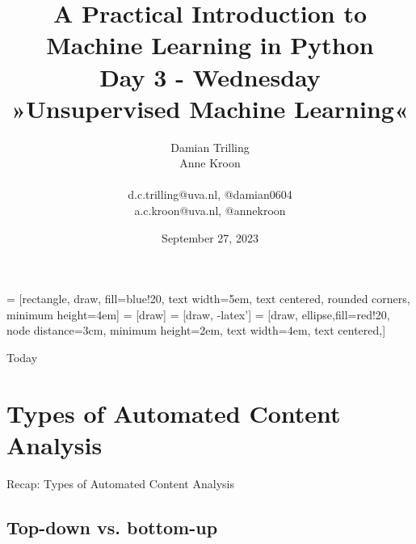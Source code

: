 \documentclass[compress]{beamer}
\begin{document}
\title[Big Data and Automated Content Analysis]{\textbf{A Practical Introduction to Machine Learning in Python} \\Day 3 - Wednesday \\ »Unsupervised Machine Learning«}
\author[Damian Trilling, Anne Kroon]{Damian Trilling \\ Anne Kroon \\ ~ \\ \footnotesize{d.c.trilling@uva.nl, @damian0604 \\a.c.kroon@uva.nl, @annekroon} \\}
\date{September 27, 2023}


 = [rectangle, draw, fill=blue!20, 
text width=5em, text centered, rounded corners, minimum height=4em]
 = [draw]
 = [draw, -latex']
 = [draw, ellipse,fill=red!20, node distance=3cm,
minimum height=2em, text width=4em, text centered,]




\begin{frame}{}
\titlepage
\end{frame}

\begin{frame}{Today}
\tableofcontents
\end{frame}




\section[Automated Content Analysis]{Types of Automated Content Analysis}
\begin{frame}{}
Recap: Types of Automated Content Analysis
\end{frame}
\subsection*{Top-down vs. bottom-up}


\begin{frame}[plain]
\end{frame}
\end{document}
